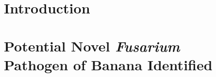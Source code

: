 \documentclass[11pt,a4paper]{report}
\begin{document}


\clearpage
\tableofcontents                     
\listoftables                     
\listoffigures                    
\begin{thesisacknowledgments}        
       
\end{thesisacknowledgments}

\begin{thesisdeclaration}       
 
\end{thesisdeclaration}

\begin{thesisabstract}              
  \begin{singlespace}    
          
 \end{singlespace}
\end{thesisabstract}

\printacronyms[name=Abbreviations]

\renewcommand{\arraystretch}{1.5} %
\newcommand{\Focub}{\textit{Fusarium oxysporum} f. sp. \textit{cubense} }
\newcommand{\Fo}{\textit{Fusarium oxysporum }}
\newcommand{\Foxy}{\textit{F. oxysporum }}
\newcommand{\Foc}{\textit{Foc }}
\chapter{Introduction}
 
\chapter{Potential Novel \textit{Fusarium} Pathogen of Banana Identified }
 
\end{document}
